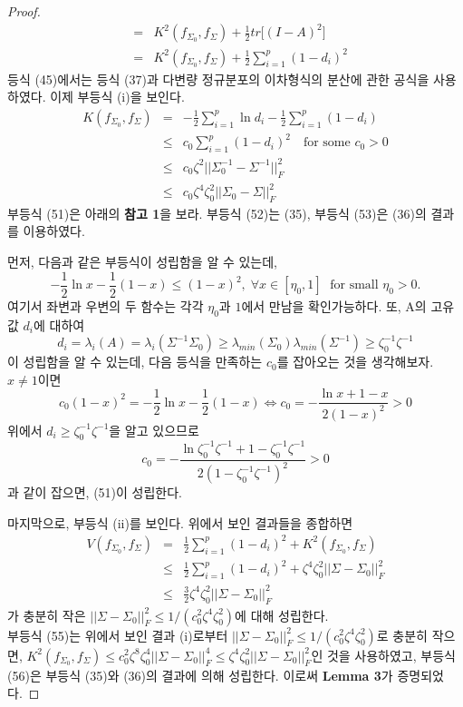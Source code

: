 \begin{proof}
\begin{eqnarray}
      &=& K^2 (f_{\Sigma_0}, f_\Sigma) + \frac{1}{2} tr \big[ (I - A)^2 \big] \\
      &=& K^2 (f_{\Sigma_0}, f_\Sigma) + \frac{1}{2} \sum_{i=1}^{p} (1 - d_i)^2
    \end{eqnarray}
    등식 (45)에서는 등식 (37)과 다변량 정규분포의 이차형식의 분산에 관한 공식을 사용하였다. 이제 부등식 (i)을 보인다.
    \begin{eqnarray}
      K(f_{\Sigma_0}, f_\Sigma) &=& - \frac{1}{2} \sum_{i=1}^{p} \ln{d_i} - \frac{1}{2} \sum_{i=1}^{p} (1 - d_i)  \\
      &\leq& c_0 \sum_{i=1}^{p} (1 - d_i)^2 \quad \text{for some } c_0 > 0  \\
      &\leq& c_0 \zeta^2 || \Sigma_0^{-1} - \Sigma^{-1} ||_F^2  \\
      &\leq& c_0 \zeta^4 \zeta_0^2 || \Sigma_0 - \Sigma ||_F^2
    \end{eqnarray}
    부등식 (51)은 아래의 \textbf{참고 1}을 보라. 부등식 (52)는 (35), 부등식 (53)은 (36)의 결과를 이용하였다.
    \begin{remark}
    먼저, 다음과 같은 부등식이 성립함을 알 수 있는데,
    \[
      -\frac{1}{2} \ln{x} -\frac{1}{2}(1 - x) \leq (1 - x)^2, \; \forall x \in [\eta_0, 1] \; \text{ for small } \eta_0 > 0.
    \]
    여기서 좌변과 우변의 두 함수는 각각 $\eta_0$과 $1$에서 만남을 확인가능하다. 또, A의 고유값 $d_i$에 대하여
    \[
    d_i = \lambda_i(A) = \lambda_i(\Sigma^{-1} \Sigma_0) \geq \lambda_{min}(\Sigma_0) \lambda_{min}(\Sigma^{-1}) \geq \zeta_0^{-1} \zeta^{-1}
    \]
    이 성립함을 알 수 있는데, 다음 등식을 만족하는 $c_0$를 잡아오는 것을 생각해보자. $x \neq 1$이면
    \[
    c_0 (1 - x)^2 = -\frac{1}{2} \ln{x} - \frac{1}{2} (1 - x) \iff c_0 = - \frac{\ln{x} + 1 - x}{2(1 - x)^2} > 0
    \]
    위에서 $d_i \geq \zeta_0^{-1} \zeta^{-1}$을 알고 있으므로
    \[
    c_0 = - \frac{\ln{\zeta_0^{-1}\zeta^{-1}} + 1 - \zeta_0^{-1}\zeta^{-1}}{2(1 - \zeta_0^{-1}\zeta^{-1})^2}  > 0
    \]
    과 같이 잡으면, (51)이 성립한다.
    \end{remark}
    마지막으로, 부등식 (ii)를 보인다. 위에서 보인 결과들을 종합하면
    \begin{eqnarray}
      V(f_{\Sigma_0}, f_\Sigma) &=& \frac{1}{2} \sum_{i=1}^{p} (1 - d_i)^2 + K^2 (f_{\Sigma_0}, f_\Sigma) \\
      &\leq& \frac{1}{2} \sum_{i=1}^{p} (1 - d_i)^2 + \zeta^4 \zeta_0^2 || \Sigma - \Sigma_0 ||_F^2 \\
      &\leq& \frac{3}{2} \zeta^4 \zeta_0^2 || \Sigma - \Sigma_0 ||_F^2
    \end{eqnarray}
    가 충분히 작은 $|| \Sigma - \Sigma_0 ||_F^2 \leq 1/(c_0^2 \zeta^4 \zeta_0^2)$에 대해 성립한다.  \\
    부등식 (55)는 위에서 보인 결과 (i)로부터 $|| \Sigma - \Sigma_0 ||_F^2 \leq 1/(c_0^2 \zeta^4 \zeta_0^2)$로 충분히 작으면, $K^2(f_{\Sigma_0}, f_{\Sigma}) \leq c_0^2 \zeta^8 \zeta_0^4 || \Sigma - \Sigma_0 ||_F^4 \leq \zeta^4 \zeta_0^2 || \Sigma - \Sigma_0 ||_F^2$인 것을 사용하였고, 부등식 (56)은 부등식 (35)와 (36)의 결과에 의해 성립한다. 이로써 \textbf{Lemma 3}가 증명되었다.
    
  \end{proof}

